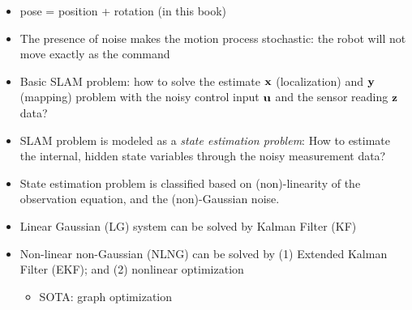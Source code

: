 \documentclass[main.tex]{subfiles}
\begin{document}
\bigskip
\begin{itemize}
\item pose = position + rotation (in this book)
\item The presence of noise makes the motion process stochastic: the robot will not move exactly as the command
\item Basic SLAM problem: how to solve the estimate $\operatorname*{\mathbf{x}}$ (localization) and $\operatorname*{\mathbf{y}}$ (mapping) problem with the noisy control input $\operatorname*{\mathbf{u}}$ and the sensor reading $\operatorname*{\mathbf{z}}$ data?
\item SLAM problem is modeled as a \textit{state estimation problem}: How to estimate the internal, hidden state variables through the noisy measurement data?
\item State estimation problem is classified based on (non)-linearity of the observation equation, and the (non)-Gaussian noise.
\item Linear Gaussian (LG) system can be solved by Kalman Filter (KF)
\item Non-linear non-Gaussian (NLNG) can be solved by (1) Extended Kalman Filter (EKF); and (2) nonlinear optimization
\begin{itemize}
	\item SOTA: graph optimization
\end{itemize}
\end{itemize}
\end{document}
